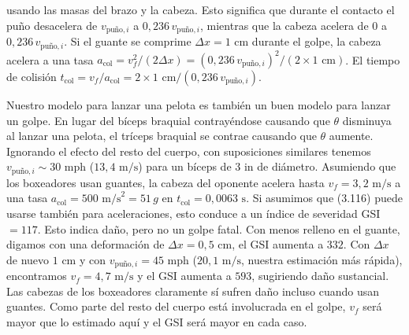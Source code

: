 \documentclass[12pt]{book}
\begin{document}
usando las masas del brazo y la cabeza. Esto significa que durante el contacto el puño desacelera de $v_{\text{puño},i}$ a $0{,}236\,v_{\text{puño},i}$, mientras que la cabeza acelera de $0$ a $0{,}236\,v_{\text{puño},i}$. Si el guante se comprime $\Delta x = 1\text{ cm}$ durante el golpe, la cabeza acelera a una tasa $a_{\text{col}} = v_f^2/(2\Delta x) = (0{,}236\,v_{\text{puño},i})^2/(2 \times 1\text{ cm})$. El tiempo de colisión $t_{\text{col}} = v_f/a_{\text{col}} = 2 \times 1\text{ cm}/(0{,}236\,v_{\text{puño},i})$.

Nuestro modelo para lanzar una pelota es también un buen modelo para lanzar un golpe. En lugar del bíceps braquial contrayéndose causando que $\theta$ disminuya al lanzar una pelota, el tríceps braquial se contrae causando que $\theta$ aumente. Ignorando el efecto del resto del cuerpo, con suposiciones similares tenemos $v_{\text{puño},i} \sim 30\text{ mph}$ ($13{,}4\text{ m/s}$) para un bíceps de $3\text{ in}$ de diámetro. Asumiendo que los boxeadores usan guantes, la cabeza del oponente acelera hasta $v_f = 3{,}2\text{ m/s}$ a una tasa $a_{\text{col}} = 500\text{ m/s}^2 = 51\,g$ en $t_{\text{col}} = 0{,}0063\text{ s}$. Si asumimos que (3.116) puede usarse también para aceleraciones, esto conduce a un índice de severidad GSI~$= 117$. Esto indica daño, pero no un golpe fatal. Con menos relleno en el guante, digamos con una deformación de $\Delta x = 0{,}5\text{ cm}$, el GSI aumenta a $332$. Con $\Delta x$ de nuevo $1\text{ cm}$ y con $v_{\text{puño},i} = 45\text{ mph}$ ($20{,}1\text{ m/s}$, nuestra estimación más rápida), encontramos $v_f = 4{,}7\text{ m/s}$ y el GSI aumenta a $593$, sugiriendo daño sustancial. Las cabezas de los boxeadores claramente sí sufren daño incluso cuando usan guantes. Como parte del resto del cuerpo está involucrada en el golpe, $v_f$ será mayor que lo estimado aquí y el GSI será mayor en cada caso.
\end{document}

